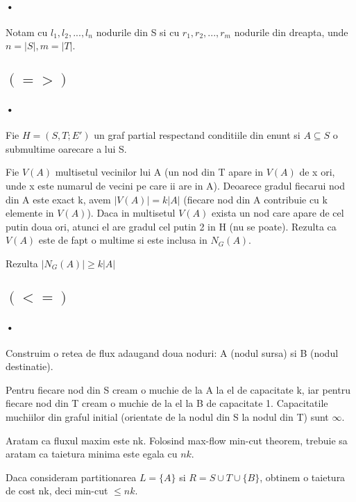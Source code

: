 \documentclass[paper=a4, fontsize=11pt]{scrartcl}
\begin{document}
\paragraph{•}
Notam cu $l_1, l_2, ..., l_n$ nodurile din S si cu $r_1, r_2, ..., r_m$ nodurile din dreapta, unde $n=\left|S\right|, m=\left|T\right|$.

\subsection{$(=>)$}

\paragraph{•}
Fie $H=(S, T; E')$ un graf partial respectand conditiile din enunt si $A\subseteq S$ o submultime oarecare a lui S.

Fie $V(A)$ multisetul vecinilor lui A (un nod din T apare in $V(A)$ de x ori, unde x este numarul de vecini pe care ii are in A). Deoarece gradul fiecarui nod din A este exact k, avem $\left|V(A)\right| = k\left|A\right|$ (fiecare nod din A contribuie cu k elemente in $V(A)$). Daca in multisetul $V(A)$ exista un nod care apare de cel putin doua ori, atunci el are gradul cel putin 2 in H (nu se poate). Rezulta ca $V(A)$ este de fapt o multime si este inclusa in $N_G(A)$.

Rezulta $\left|N_G(A)\right| \geqslant k \left| A\right| $

\subsection{$(<=)$}

\paragraph{•}
Construim o retea de flux adaugand doua noduri: A (nodul sursa) si B (nodul destinatie).

Pentru fiecare nod din S cream o muchie de la A la el de capacitate k, iar pentru fiecare nod din T cream o muchie de la el la B de capacitate 1. Capacitatile muchiilor din graful initial (orientate de la nodul din S la nodul din T) sunt $\infty$.

Aratam ca fluxul maxim este nk. Folosind max-flow min-cut theorem, trebuie sa aratam ca taietura minima este egala cu $nk$.

Daca consideram partitionarea $L=\{A\}$ si $R=S\cup T\cup \{B\}$, obtinem o taietura de cost nk, deci min-cut $\leqslant nk$.
\end{document}
